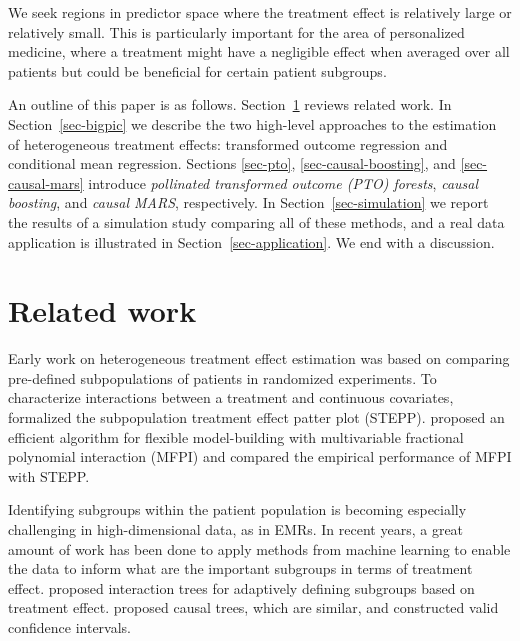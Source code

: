 \documentclass{article}
\begin{document}
We seek regions in predictor space where the treatment effect is relatively
large or relatively small.
This is particularly important for the area of personalized medicine,
where a treatment might have a negligible effect when averaged over all
patients but could be beneficial for certain patient subgroups.

An outline of this paper is as follows. Section~\ref{sec-review} reviews
related work.
In Section~\ref{sec-bigpic} we describe the two high-level approaches
to the estimation of heterogeneous treatment effects: transformed outcome
regression and conditional mean regression.
Sections \ref{sec-pto}, \ref{sec-causal-boosting}, and \ref{sec-causal-mars}
introduce {\it pollinated transformed outcome (PTO) forests},
{\it causal boosting}, and {\it causal MARS}, respectively.
In Section~\ref{sec-simulation} we report the results of a simulation study
comparing all of these methods, and a real data application
is illustrated in Section~\ref{sec-application}. We end with a discussion.




\section{Related work}
\label{sec-review}

Early work on heterogeneous treatment effect estimation \citep{GailSimon85}
was based on comparing pre-defined subpopulations of patients in randomized
experiments. To characterize interactions between a treatment and continuous
covariates, \cite{BonettiGelber04} formalized the
subpopulation treatment
effect patter plot (STEPP). \cite{Sauerbrei-etal07}
proposed an efficient
algorithm for flexible model-building with multivariable fractional polynomial
interaction (MFPI) and compared the empirical performance of MFPI with STEPP.

Identifying subgroups within the patient population is becoming especially
challenging in high-dimensional data, as in EMRs. In
recent years, a great amount of work has been done to apply methods from
machine learning to enable the data to inform what are the important subgroups
in terms of treatment effect. \cite{Su-etal09} proposed
interaction trees for
adaptively defining subgroups based on treatment effect.
\cite{AtheyImbens16}
proposed causal trees, which are similar, and constructed valid confidence
intervals.
\end{document}
